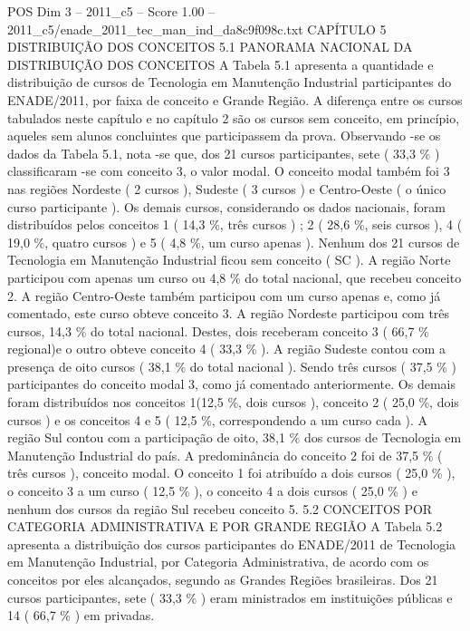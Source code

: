 \begin{textsample}{POS Dim 3 – 2011\_c5 – Score 1.00 – 2011\_c5/enade\_2011\_tec\_man\_ind\_da8c9f098c.txt}  \label{ex:f3_pos_225}
CAPÍTULO 5 DISTRIBUIÇÃO DOS CONCEITOS 5.1 PANORAMA NACIONAL DA DISTRIBUIÇÃO DOS CONCEITOS A Tabela 5.1 apresenta a quantidade e distribuição de cursos de Tecnologia em Manutenção Industrial participantes do ENADE/2011, por faixa de conceito e Grande Região.
A diferença entre os cursos tabulados neste capítulo e no capítulo 2 são os cursos sem conceito, em princípio, aqueles sem alunos concluintes que participassem da prova.
Observando -se os dados da Tabela 5.1, nota -se que, dos 21 cursos participantes, sete ( 33,3 \% ) classificaram -se com conceito 3, o valor modal.
O conceito modal também foi 3 nas regiões Nordeste ( 2 cursos ), Sudeste ( 3 cursos ) e Centro-Oeste ( o único curso participante ).
Os demais cursos, considerando os dados nacionais, foram distribuídos pelos conceitos 1 ( 14,3 \%, três cursos ) ; 2 ( 28,6 \%, seis cursos ), 4 ( 19,0 \%, quatro cursos ) e 5 ( 4,8 \%, um curso apenas ).
Nenhum dos 21 cursos de Tecnologia em Manutenção Industrial ficou sem conceito ( SC ).
A região Norte participou com apenas um curso ou 4,8 \% do total nacional, que recebeu conceito 2.
A região Centro-Oeste também participou com um curso apenas e, como já comentado, este curso obteve conceito 3.
A região Nordeste participou com três cursos, 14,3 \% do total nacional.
Destes, dois receberam conceito 3 ( 66,7 \% regional)e o outro obteve conceito 4 ( 33,3 \% ).
A região Sudeste contou com a presença de oito cursos ( 38,1 \% do total nacional ).
Sendo três cursos ( 37,5 \% ) participantes do conceito modal 3, como já comentado anteriormente.
Os demais foram distribuídos nos conceitos 1(12,5 \%, dois cursos ), conceito 2 ( 25,0 \%, dois cursos ) e os conceitos 4 e 5 ( 12,5 \%, correspondendo a um curso cada ).
A região Sul contou com a participação de oito, 38,1 \% dos cursos de Tecnologia em Manutenção Industrial do país.
A predominância do conceito 2 foi de 37,5 \% ( três cursos ), conceito modal.
O conceito 1 foi atribuído a dois cursos ( 25,0 \% ), o conceito 3 a um curso ( 12,5 \% ), o conceito 4 a dois cursos ( 25,0 \% ) e nenhum dos cursos da região Sul recebeu conceito 5. 5.2 CONCEITOS POR CATEGORIA ADMINISTRATIVA E POR GRANDE REGIÃO A Tabela 5.2 apresenta a distribuição dos cursos participantes do ENADE/2011 de Tecnologia em Manutenção Industrial, por Categoria Administrativa, de acordo com os conceitos por eles alcançados, segundo as Grandes Regiões brasileiras.
Dos 21 cursos participantes, sete ( 33,3 \% ) eram ministrados em instituições públicas e 14 ( 66,7 \% ) em privadas.

\end{textsample}
